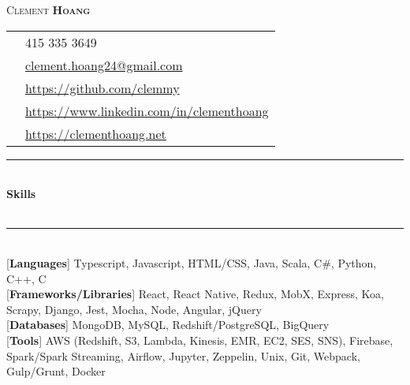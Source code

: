 \documentclass[10pt]{article}
\newcommand{\cvtitle}[4] {%
	{\LARGE\color{#2}\textsc{#1}}\hspace{\stretch{3}}{\large \textbf{#3}}\\[#4]}
\newcommand{\positionedbox}[3]{%
	\begin{minipage}{#2}
		\begin{flush#1}
			#3
		\end{flush#1}
	\end{minipage}}
\newcommand{\cvsectiontitle}[1]{%
	\rule{\linewidth}{0.2mm}\\%
		{\large\indent\textbf{#1}}\\%
	\\[-6.5mm]\rule{\linewidth}{0.2mm}\\[2mm]%
	}
\begin{document}
\cvtitle{Clement \textbf{Hoang}}{BrickRed}{}{0.3cm}
\positionedbox{left}{0.7\textwidth}{
	\begin{tabular}{ c l }
		{\FA \faPhone} & 415 335 3649 \\
		{\FA \faEnvelope} & \href{mailto:clement.hoang24@gmail.com}{clement.hoang24@gmail.com} \\
		{\FA \faGithub} & \href{https://github.com/clemmy}{https://github.com/clemmy} \\
		{\FA \faLinkedIn} & \href{https://www.linkedin.com/in/clementhoang}{https://www.linkedin.com/in/clementhoang} \\
		{\FA \faFire} & \href{https://clementhoang.net}{https://clementhoang.net}
	\end{tabular}
}
\vspace{0.2cm}

\cvsectiontitle{Skills}
[\textbf{Languages}] Typescript, Javascript, HTML/CSS, Java, Scala, C\#, Python, C++, C \\[0.2cm]
[\textbf{Frameworks/Libraries}] React, React Native, Redux, MobX, Express, Koa, Scrapy, Django, Jest, Mocha, Node, Angular, jQuery \\[0.2cm]
[\textbf{Databases}] MongoDB, MySQL, Redshift/PostgreSQL, BigQuery \\[0.2cm]
[\textbf{Tools}] AWS (Redshift, S3, Lambda, Kinesis, EMR, EC2, SES, SNS), Firebase, Spark/Spark Streaming, Airflow, Jupyter, Zeppelin, Unix, Git, Webpack, Gulp/Grunt, Docker
\end{document}
